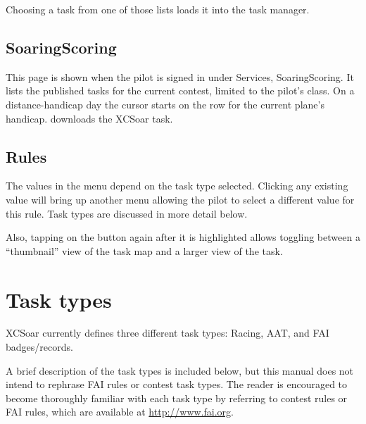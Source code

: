 Choosing a task from one of those lists loads it into the task manager.

\subsection*{SoaringScoring}
This page is shown when the pilot is signed in under Services,
 SoaringScoring.  It lists the published
tasks for the current contest, limited to the pilot's class.  On a
distance-handicap day the cursor starts on the row for the current
plane's handicap.   downloads the XCSoar task.

\subsection*{Rules}
The values in the menu depend on the task type selected. Clicking any existing
 value will bring up another menu allowing the pilot to select a
different value for this rule.  Task types are discussed in more detail below.

Also, tapping on the  button again after it is highlighted allows
toggling between a ``thumbnail'' view of the task map and a larger view of the task.

\section{Task types}
XCSoar currently defines three different task types: Racing, AAT, and FAI badges/records.

A brief description of the task types is included below, but this manual does
not intend to rephrase FAI rules or contest task types. The reader is encouraged
to become thoroughly familiar with each task type by referring to contest rules
or FAI rules, which are available at \url{http://www.fai.org}.



